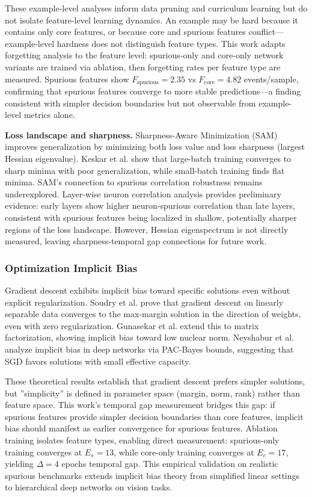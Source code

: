 These example-level analyses inform data pruning and curriculum learning but do not isolate feature-level learning dynamics. An example may be hard because it contains only core features, or because core and spurious features conflict---example-level hardness does not distinguish feature types. This work adapts forgetting analysis to the feature level: spurious-only and core-only network variants are trained via ablation, then forgetting rates per feature type are measured. Spurious features show $F_{\text{spurious}} = 2.35$ vs $F_{\text{core}} = 4.82$ events/sample, confirming that spurious features converge to more stable predictions---a finding consistent with simpler decision boundaries but not observable from example-level metrics alone.

\textbf{Loss landscape and sharpness.} Sharpness-Aware Minimization (SAM) improves generalization by minimizing both loss value and loss sharpness (largest Hessian eigenvalue). Keskar et al. show that large-batch training converges to sharp minima with poor generalization, while small-batch training finds flat minima. SAM's connection to spurious correlation robustness remains underexplored. Layer-wise neuron correlation analysis provides preliminary evidence: early layers show higher neuron-spurious correlation than late layers, consistent with spurious features being localized in shallow, potentially sharper regions of the loss landscape. However, Hessian eigenspectrum is not directly measured, leaving sharpness-temporal gap connections for future work.

\subsubsection{Optimization Implicit Bias}

Gradient descent exhibits implicit bias toward specific solutions even without explicit regularization. Soudry et al. prove that gradient descent on linearly separable data converges to the max-margin solution in the direction of weights, even with zero regularization. Gunasekar et al. extend this to matrix factorization, showing implicit bias toward low nuclear norm. Neyshabur et al. analyze implicit bias in deep networks via PAC-Bayes bounds, suggesting that SGD favors solutions with small effective capacity.

These theoretical results establish that gradient descent prefers simpler solutions, but ''simplicity'' is defined in parameter space (margin, norm, rank) rather than feature space. This work's temporal gap measurement bridges this gap: if spurious features provide simpler decision boundaries than core features, implicit bias should manifest as earlier convergence for spurious features. Ablation training isolates feature types, enabling direct measurement: spurious-only training converges at $E_s=13$, while core-only training converges at $E_c=17$, yielding $\Delta=4$ epochs temporal gap. This empirical validation on realistic spurious benchmarks extends implicit bias theory from simplified linear settings to hierarchical deep networks on vision tasks.

